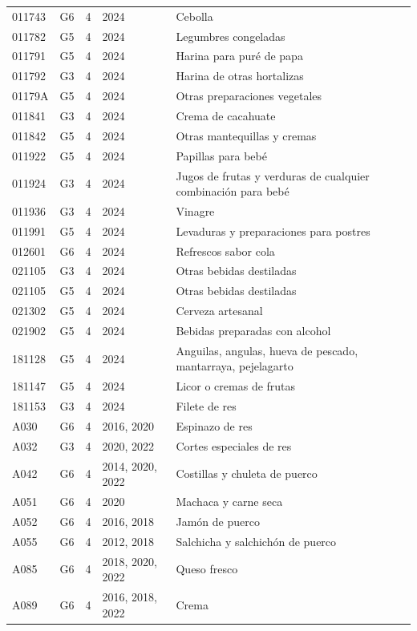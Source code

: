 \begin{table}[ht]
\begin{tabular}{llrll}
  011743 & G6 &   4 & 2024 & Cebolla \\ 
  011782 & G5 &   4 & 2024 & Legumbres congeladas \\ 
  011791 & G5 &   4 & 2024 & Harina para puré de papa \\ 
  011792 & G3 &   4 & 2024 & Harina de otras hortalizas \\ 
  01179A & G5 &   4 & 2024 & Otras preparaciones vegetales \\ 
  011841 & G3 &   4 & 2024 & Crema de cacahuate \\ 
  011842 & G5 &   4 & 2024 & Otras mantequillas y cremas \\ 
  011922 & G5 &   4 & 2024 & Papillas para bebé \\ 
  011924 & G3 &   4 & 2024 & Jugos de frutas y verduras de cualquier combinación para bebé \\ 
  011936 & G3 &   4 & 2024 & Vinagre \\ 
  011991 & G5 &   4 & 2024 & Levaduras y preparaciones para postres \\ 
  012601 & G6 &   4 & 2024 & Refrescos sabor cola \\ 
  021105 & G3 &   4 & 2024 & Otras bebidas destiladas \\ 
  021105 & G5 &   4 & 2024 & Otras bebidas destiladas \\ 
  021302 & G5 &   4 & 2024 & Cerveza artesanal \\ 
  021902 & G5 &   4 & 2024 & Bebidas preparadas con alcohol \\ 
  181128 & G5 &   4 & 2024 & Anguilas, angulas, hueva de pescado, mantarraya, pejelagarto \\ 
  181147 & G5 &   4 & 2024 & Licor o cremas de frutas \\ 
  181153 & G3 &   4 & 2024 & Filete de res \\ 
  A030 & G6 &   4 & 2016, 2020 & Espinazo de res \\ 
  A032 & G3 &   4 & 2020, 2022 & Cortes especiales de res \\ 
  A042 & G6 &   4 & 2014, 2020, 2022 & Costillas y chuleta de puerco \\ 
  A051 & G6 &   4 & 2020 & Machaca y carne seca \\ 
  A052 & G6 &   4 & 2016, 2018 & Jamón de puerco \\ 
  A055 & G6 &   4 & 2012, 2018 & Salchicha y salchichón de puerco \\ 
  A085 & G6 &   4 & 2018, 2020, 2022 & Queso fresco \\ 
  A089 & G6 &   4 & 2016, 2018, 2022 & Crema \\ 

\end{tabular}
\end{table}
